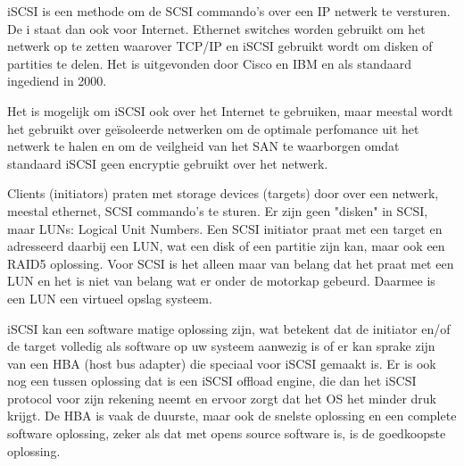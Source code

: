 iSCSI is een methode om de SCSI commando's over een IP netwerk te versturen. De i staat dan ook voor Internet. Ethernet switches worden gebruikt om het netwerk op te zetten waarover TCP/IP en iSCSI gebruikt wordt om disken of partities te delen. Het is uitgevonden door Cisco en IBM en als standaard ingediend in 2000.

Het is mogelijk om iSCSI ook over het Internet te gebruiken, maar meestal wordt het gebruikt over ge\"isoleerde netwerken om de optimale perfomance uit het netwerk te halen en om de veilgheid van het SAN te waarborgen omdat standaard iSCSI geen encryptie gebruikt over het netwerk.

Clients (initiators) praten met storage devices (targets) door over een netwerk, meestal ethernet, SCSI commando's te sturen. Er zijn geen "disken" in SCSI, maar LUNs: Logical Unit Numbers. Een SCSI initiator praat met een target en adresseerd daarbij een LUN, wat een disk of een partitie zijn kan, maar ook een RAID5 oplossing. Voor SCSI is het alleen maar van belang dat het praat met een LUN en het is niet van belang wat er onder de motorkap gebeurd. Daarmee is een LUN een virtueel opslag systeem.

iSCSI kan een software matige oplossing zijn, wat betekent dat de initiator en/of de target volledig als software op uw systeem aanwezig is of er kan sprake zijn van een HBA (host bus adapter) die speciaal voor iSCSI gemaakt is. Er is ook nog een tussen oplossing dat is een iSCSI offload engine, die dan het iSCSI protocol voor zijn rekening neemt en ervoor zorgt dat het OS het minder druk krijgt. De HBA is vaak de duurste, maar ook de snelste oplossing en een complete software oplossing, zeker als dat met opens source software is, is de goedkoopste oplossing.
